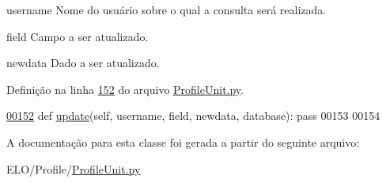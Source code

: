 \begin{DoxyItemize}
\item username Nome do usuário sobre o qual a consulta será realizada. \item field Campo a ser atualizado.\end{DoxyItemize}
\begin{DoxyItemize}
\item newdata Dado a ser atualizado. \end{DoxyItemize}


Definição na linha \hyperlink{ProfileUnit_8py_source_l00152}{152} do arquivo \hyperlink{ProfileUnit_8py_source}{Profile\+Unit.\+py}.


\begin{DoxyCode}
\hypertarget{classProfile_1_1ProfileUnit_1_1IfPersProfile_l00152}{}\hyperlink{classProfile_1_1ProfileUnit_1_1IfPersProfile_a3a9da33f5497c97807cce70960d9db1a}{00152}     \textcolor{keyword}{def }\hyperlink{classProfile_1_1ProfileUnit_1_1IfPersProfile_a3a9da33f5497c97807cce70960d9db1a}{update}(self, username, field, newdata, database): \textcolor{keyword}{pass}
00153 
00154 
\end{DoxyCode}


A documentação para esta classe foi gerada a partir do seguinte arquivo\+:\begin{DoxyCompactItemize}
\item 
E\+L\+O/\+Profile/\hyperlink{ProfileUnit_8py}{Profile\+Unit.\+py}\end{DoxyCompactItemize}
